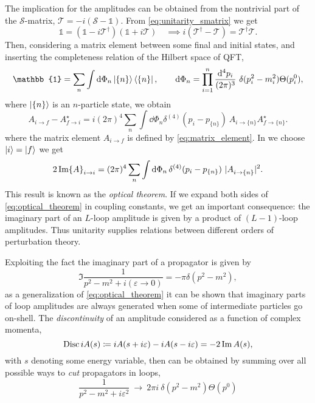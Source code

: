 The implication for the amplitudes can be obtained from the nontrivial part 
of the $\mathcal{S}$-matrix, $\mathcal{T} = -i(\mathcal{S}-\mathbb{1})$.
From \cref{eq:unitarity_smatrix} we get
\begin{equation}
  \mathbb{1} = (\mathbb{1}-i\mathcal{T}^\dagger)(\mathbb{1}+i\mathcal{T}) \quad\implies i(\mathcal{T}^\dagger- \mathcal{T}) = \mathcal{T}^\dagger\mathcal{T}.
\end{equation}
Then, considering a matrix element between some final and initial states,
and inserting the completeness relation of the Hilbert space of QFT,
\begin{equation}
  \mathbb{1} = \sum_n\int \dd{\Phi_n} \ket{\{n\}}\bra{\{n\}},    \qquad \dd{\Phi_n}=\prod_{i=1}^{n}\frac{\dd^4{p_i} }{(2\pi)^3} ~\delta(p_i^2-m_i^2) \Theta(p_i^{0}),
\end{equation}
where $\ket{\{n\}}$ is an $n$-particle state, we obtain
\begin{equation}
  A_{i\to f} - A_{f \to i}^\star = i (2\pi)^4 \sum_n \int \dd{\Phi_n} \delta^{(4)} (p_i - p_{\{n\}}) ~ A_{i \to \{n\}}^{\phantom{\star}} A^\star_{f \to \{n\}}.
\end{equation}
where the matrix element $A_{i \to f}$ is defined by \cref{eq:matrix_element}. 
In we choose $\ket{i} = \ket{f}$ we get 
\begin{equation} \label{eq:optical_theorem}
  2 \Im{A}_{i\to i} = (2\pi)^4 \sum_n \int \dd{\Phi_n} \delta^{(4)} (p_i - p_{\{n\}}) ~ \vert A_{i \to \{n\}}^{\phantom{\star}} \vert^2.
\end{equation}
This result is known as the \emph{optical theorem}. 
If we expand both sides of \cref{eq:optical_theorem} in coupling constants, we get an important
consequence: the imaginary part of an $L$-loop amplitude is given by a product of $(L-1)$-loop amplitudes.
Thus unitarity supplies relations between different orders of perturbation theory.

Exploiting the fact the imaginary part of a propagator is given by
\begin{equation}
  \Im\frac{1}{p^2-m^2+i(\varepsilon \to 0)} = -\pi\delta(p^2-m^2),
\end{equation}
as a generalization of \cref{eq:optical_theorem} it can be shown \cite{Eden:1966dnq,Cutkosky1960}
that imaginary parts of loop amplitudes are always generated when some of intermediate particles go on-shell.
The \emph{discontinuity} of an amplitude considered as a function of complex momenta,
\begin{equation}
  \operatorname{Disc} iA(s) \coloneqq iA(s+i\varepsilon)-iA(s-i\varepsilon) = -2\Im A(s),
\end{equation}
with $s$ denoting some energy variable,
then can be obtained \cite{Cutkosky1960} by summing over all possible ways to \emph{cut} propagators in loops,
\begin{equation} \label{eq:cut}
  \frac{1}{p^2-m^2+i\varepsilon^2} ~\longrightarrow~ 2\pi i ~\delta(p^2-m^2) \Theta(p^{0})
\end{equation}

